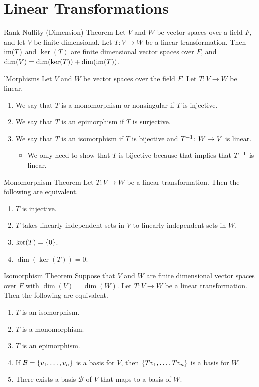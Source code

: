 \documentclass[class=article, crop=false]{standalone}
\begin{document}
  \section{Linear Transformations}
  \begin{theorem}{Rank-Nullity (Dimension) Theorem}
    Let $V$ and $W$ be vector spaces over a field $F$, and let $V$ be finite dimensional. Let $T\colon V\to W$ be a linear transformation. Then $\operatorname{im}(T)$ and $\ker(T)$ are finite dimensional vector spaces over $F$, and $\dim(V) = \dim(\ker(T)) + \dim(\operatorname{im}(T))$.
  \end{theorem}
  \begin{definition}{'Morphisms}
    Let $V$ and $W$ be vector spaces over the field $F$. Let $T\colon V\to W$ be linear.
    \begin{enumerate}[label=(\alph*)]
      \item We say that $T$ is a monomorphism or nonsingular if $T$ is injective.
      \item We say that $T$ is an epimorphism if $T$ is surjective.
      \item We say that $T$ is an isomorphism if $T$ is bijective and $T^{-1}\colon W\to V$ is linear.
      \begin{itemize}
        \item We only need to show that $T$ is bijective because that implies that $T^{-1}$ is linear.
      \end{itemize}
    \end{enumerate}
  \end{definition}
  \begin{theorem}{Monomorphism Theorem}
    Let $T\colon V\to W$ be a linear transformation. Then the following are equivalent.
    \begin{enumerate}[label=(\alph*)]
      \item $T$ is injective.
      \item $T$ takes linearly independent sets in $V$ to linearly independent sets in $W$.
      \item $\ker(T) = \left\{0\right\}$.
      \item $\dim(\ker(T)) = 0$.
    \end{enumerate}
  \end{theorem}
  \begin{theorem}{Isomorphism Theorem}
    Suppose that $V$ and $W$ are finite dimensional vector spaces over $F$ with $\dim(V) = \dim(W)$. Let $T\colon V\to W$ be a linear transformation. Then the following are equivalent.
    \begin{enumerate}[label=(\alph*)]
      \item $T$ is an isomorphism.
      \item $T$ is a monomorphism.
      \item $T$ is an epimorphism.
      \item If $\mathcal{B} = \left\{v_1, \dotsc, v_n\right\}$ is a basis for $V$, then $\left\{Tv_1, \dotsc,Tv_n\right\}$ is a basis for $W$.
      \item There exists a basis $\mathcal{B}$ of $V$ that maps to a basis of $W$.
    \end{enumerate}
  \end{theorem}
\end{document}
